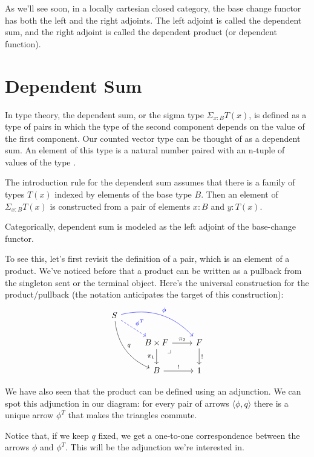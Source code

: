 \documentclass[DaoFP]{subfiles}
\begin{document}
As we'll see soon, in a locally cartesian closed category, the base change functor has both the left and the right adjoints. The left adjoint is called the dependent sum, and the right adjoint is called the dependent product (or dependent function).

\section{Dependent Sum}

In type theory, the dependent sum, or the sigma type $\Sigma_{x : B} T(x)$, is defined as a type of pairs in which the type of the second component depends on the value of the first component. Our counted vector type can be thought of as a dependent sum. An element of this type is a natural number  paired with an n-tuple of values  of the type .

The introduction rule for the dependent sum assumes that there is a family of types $T(x)$ indexed by elements of the base type $B$. Then an element of $\Sigma_{x : B} T(x)$ is constructed from a pair of elements $x \colon B$ and $y \colon T(x)$. 

Categorically, dependent sum is modeled as the left adjoint of the base-change functor. 

To see this, let's first revisit the definition of a pair, which is an element of a product. We've noticed before that a product can be written as a pullback from the singleton sent or the terminal object. Here's the universal construction for the product/pullback (the notation anticipates the target of this construction):
\[
 \begin{tikzcd}
 S
 \arrow[dr, blue, dashed, "\phi^T"]
 \arrow[drr, blue, bend left, "\phi"]
 \arrow[ddr, bend right, "q"]
 \\
 &B \times F
\arrow[dr, phantom,  , very near start, "\lrcorner"]
 \arrow[r, "\pi_2"]
 \arrow[d, "\pi_1"']
 &F
 \arrow[d, "!"]
 \\
 &B
 \arrow[r, "!"]
 &1
  \end{tikzcd}
\]

We have also seen that the product can be defined using an adjunction. We can spot this adjunction in our diagram: for every pair of arrows $\langle \phi, q \rangle$ there is a unique arrow $\phi^T$ that makes the triangles commute. 

Notice that, if we keep $q$ fixed, we get a one-to-one correspondence between the arrows $\phi$ and $\phi^T$. This will be the adjunction we're interested in.
\end{document}
